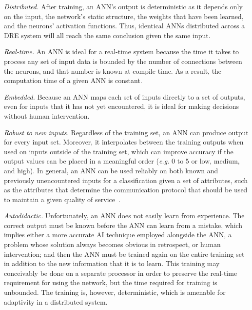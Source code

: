 \documentclass[conference]{IEEEtran}
\begin{document}
\emph{Distributed.} After training, an ANN's output is deterministic as it depends only on the input, the network's static structure, the weights that have been learned, and the neurons' activation functions. Thus, identical ANNs distributed across a DRE system will all reach the same conclusion given the same input.

\emph{Real-time.} An ANN is ideal for a real-time system because the time it  takes to process any set of input data is bounded by the number of connections between the neurons, and that number  is known at compile-time. As a result, the computation time of a given ANN is constant.

\emph{Embedded.} Because an ANN maps each set of inputs directly to a set of outputs, even for inputs that it has not yet encountered, it is ideal for making decisions without human intervention.

\emph{Robust to new inputs.} Regardless of the training set, an ANN can produce output for every input set. Moreover, it interpolates between the training outputs when used on inputs outside of the training set, which can improve accuracy if the output values can be placed in a meaningful order (\emph{e.g.} 0 to 5 or low, medium, and high). In general, an ANN can be used reliably  on both known and previously unencountered inputs for a classification given a set of attributes, such as the attributes that determine the communication protocol that should be used to maintain a given quality of service~\cite{Hoffert:10}.

\emph{Autodidactic.} Unfortunately, an ANN does not easily learn from experience. The correct output must be known before the ANN can learn from a mistake, which implies either a more accurate AI technique employed alongside the ANN, a problem whose solution always becomes obvious in retrospect, or human intervention; and then the ANN must be trained again on the entire training set in addition to the new information that it is to learn. This training may conceivably be done on a separate processor in order to preserve the real-time requirement for using the network, but the time required for training is unbounded. The training is, however, deterministic, which is amenable for adaptivity in a distributed system.
\end{document}
